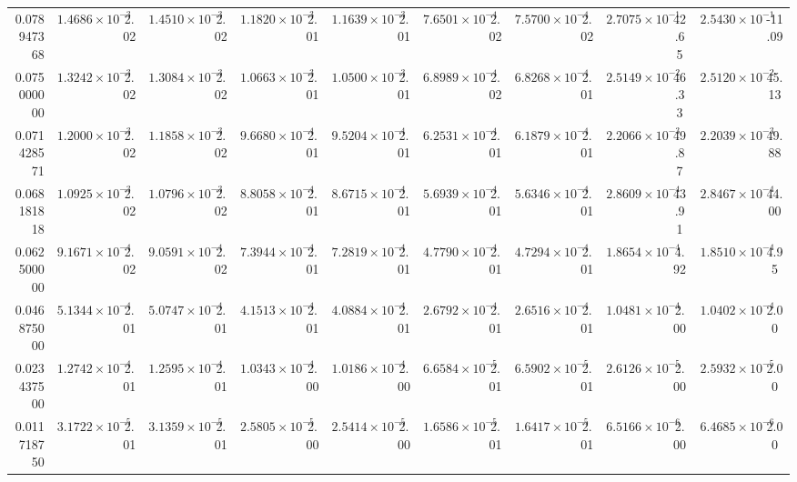 \begin{table}
{\begin{tabular}{r cc cc cc cc cc cc cc cc }
0.078947368 & $1.4686\times10^{-3}$ & 2.02 & $1.4510\times10^{-3}$ & 2.02 & $1.1820\times10^{-3}$ & 2.01 & $1.1639\times10^{-3}$ & 2.01 & $7.6501\times10^{-4}$ & 2.02 & $7.5700\times10^{-4}$ & 2.02 & $2.7075\times10^{-1}$ & 42.65 & $2.5430\times10^{-1}$ & -11.09 \\
0.075000000 & $1.3242\times10^{-3}$ & 2.02 & $1.3084\times10^{-3}$ & 2.02 & $1.0663\times10^{-3}$ & 2.01 & $1.0500\times10^{-3}$ & 2.01 & $6.8989\times10^{-4}$ & 2.02 & $6.8268\times10^{-4}$ & 2.01 & $2.5149\times10^{-2}$ & 46.33 & $2.5120\times10^{-2}$ & 45.13 \\
0.071428571 & $1.2000\times10^{-3}$ & 2.02 & $1.1858\times10^{-3}$ & 2.02 & $9.6680\times10^{-4}$ & 2.01 & $9.5204\times10^{-4}$ & 2.01 & $6.2531\times10^{-4}$ & 2.01 & $6.1879\times10^{-4}$ & 2.01 & $2.2066\times10^{-3}$ & 49.87 & $2.2039\times10^{-3}$ & 49.88 \\
0.068181818 & $1.0925\times10^{-3}$ & 2.02 & $1.0796\times10^{-3}$ & 2.02 & $8.8058\times10^{-4}$ & 2.01 & $8.6715\times10^{-4}$ & 2.01 & $5.6939\times10^{-4}$ & 2.01 & $5.6346\times10^{-4}$ & 2.01 & $2.8609\times10^{-4}$ & 43.91 & $2.8467\times10^{-4}$ & 44.00 \\
0.062500000 & $9.1671\times10^{-4}$ & 2.02 & $9.0591\times10^{-4}$ & 2.02 & $7.3944\times10^{-4}$ & 2.01 & $7.2819\times10^{-4}$ & 2.01 & $4.7790\times10^{-4}$ & 2.01 & $4.7294\times10^{-4}$ & 2.01 & $1.8654\times10^{-4}$ & 4.92 & $1.8510\times10^{-4}$ & 4.95 \\
0.046875000 & $5.1344\times10^{-4}$ & 2.01 & $5.0747\times10^{-4}$ & 2.01 & $4.1513\times10^{-4}$ & 2.01 & $4.0884\times10^{-4}$ & 2.01 & $2.6792\times10^{-4}$ & 2.01 & $2.6516\times10^{-4}$ & 2.01 & $1.0481\times10^{-4}$ & 2.00 & $1.0402\times10^{-4}$ & 2.00 \\
0.023437500 & $1.2742\times10^{-4}$ & 2.01 & $1.2595\times10^{-4}$ & 2.01 & $1.0343\times10^{-4}$ & 2.00 & $1.0186\times10^{-4}$ & 2.00 & $6.6584\times10^{-5}$ & 2.01 & $6.5902\times10^{-5}$ & 2.01 & $2.6126\times10^{-5}$ & 2.00 & $2.5932\times10^{-5}$ & 2.00 \\
0.011718750 & $3.1722\times10^{-5}$ & 2.01 & $3.1359\times10^{-5}$ & 2.01 & $2.5805\times10^{-5}$ & 2.00 & $2.5414\times10^{-5}$ & 2.00 & $1.6586\times10^{-5}$ & 2.01 & $1.6417\times10^{-5}$ & 2.01 & $6.5166\times10^{-6}$ & 2.00 & $6.4685\times10^{-6}$ & 2.00 \\
\bottomrule
\end{tabular}}
\end{table}
